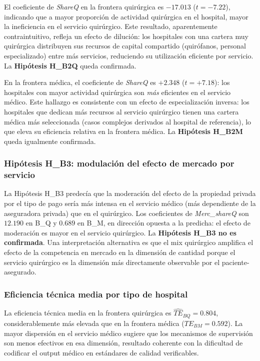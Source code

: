 El coeficiente de \textit{ShareQ} en la frontera quirúrgica es $-17.013$ ($t = -7.22$), indicando que a mayor proporción de actividad quirúrgica en el hospital, mayor la ineficiencia en el servicio quirúrgico. Este resultado, aparentemente contraintuitivo, refleja un efecto de dilución: los hospitales con una cartera muy quirúrgica distribuyen sus recursos de capital compartido (quirófanos, personal especializado) entre más servicios, reduciendo su utilización eficiente por servicio. La \textbf{Hipótesis H\_B2Q} queda confirmada.

En la frontera médica, el coeficiente de \textit{ShareQ} es $+2.348$ ($t = +7.18$): los hospitales con mayor actividad quirúrgica son \emph{más} eficientes en el servicio médico. Este hallazgo es consistente con un efecto de especialización inversa: los hospitales que dedican más recursos al servicio quirúrgico tienen una cartera médica más seleccionada (casos complejos derivados al hospital de referencia), lo que eleva su eficiencia relativa en la frontera médica. La \textbf{Hipótesis H\_B2M} queda igualmente confirmada.

\subsubsection{Hipótesis H\_B3: modulación del efecto de mercado por servicio}

La Hipótesis H\_B3 predecía que la moderación del efecto de la propiedad privada por el tipo de pago sería más intensa en el servicio médico (más dependiente de la aseguradora privada) que en el quirúrgico. Los coeficientes de \textit{Merc\_shareQ} son $12.190$ en B\_Q y $0.689$ en B\_M, en dirección opuesta a la predicha: el efecto de moderación es mayor en el servicio quirúrgico. La \textbf{Hipótesis H\_B3 no es confirmada}. Una interpretación alternativa es que el mix quirúrgico amplifica el efecto de la competencia en mercado en la dimensión de cantidad porque el servicio quirúrgico es la dimensión más directamente observable por el paciente-asegurado.

\subsubsection{Eficiencia técnica media por tipo de hospital}

La eficiencia técnica media en la frontera quirúrgica es $\widehat{TE}_{BQ} = 0.804$, considerablemente más elevada que en la frontera médica ($\widehat{TE}_{BM} = 0.592$). La mayor dispersión en el servicio médico sugiere que los mecanismos de supervisión son menos efectivos en esa dimensión, resultado coherente con la dificultad de codificar el output médico en estándares de calidad verificables.

